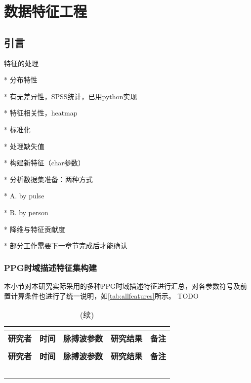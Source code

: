 \chapter{数据特征工程}
\section{引言}


特征的处理

* 分布特性

  * 有无差异性，SPSS统计，已用python实现

  * 特征相关性，heatmap

* 标准化

* 处理缺失值

* 构建新特征（char参数）

* 分析数据集准备：两种方式

  * A. by pulse

  * B. by person

* 降维与特征贡献度

  * 部分工作需要下一章节完成后才能确认

\subsection{PPG时域描述特征集构建}
本小节对本研究实际采用的多种PPG时域描述特征进行汇总，对各参数符号及前置计算条件也进行了统一说明，如\autoref{tab:allfeatures}所示。
TODO
\begin{center}
    \fontsize{10}{4}
    \begin{longtable}{p{3cm}<{\centering}p{1cm}<{\centering}p{2cm}<{\centering}p{6cm}<{\centering}p{1cm}<{\centering}}
        \caption{本研究使用的所有PPG时域指标一览}\\
        \label{tab:allfeatures}\\
        \hline\hline
            \textbf{研究者}&\textbf{时间}&\textbf{脉搏波参数}&\textbf{研究结果}&\textbf{备注}\\
        \hline
        \endfirsthead
        \caption[]{(续)}\\
        \hline
            \textbf{研究者}&\textbf{时间}&\textbf{脉搏波参数}&\textbf{研究结果}&\textbf{备注}\\
        \hline
        \endhead 
        \hline
        \endfoot
        \hline\hline
        \endlastfoot
        &       &       &       &  \\
        &       &       &       &  \\
        &       &       &       &  \\
        &       &       &       &  \\
        &       &       &       &  \\
    \end{longtable}
\end{center}
